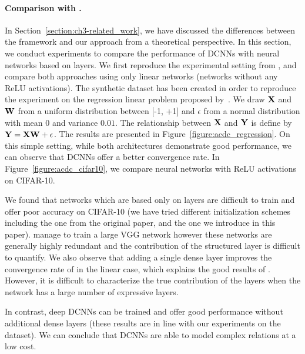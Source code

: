 \paragraph{Comparison with \ACDC \citep{moczulski2015acdc}.}


In Section~\ref{section:ch3-related_work}, we have discussed the differences between the \ACDC framework and our approach from a theoretical perspective.
In this section, we conduct experiments to compare the performance of DCNNs with neural networks based on \ACDC layers. 
We first reproduce the experimental setting from \citet{moczulski2015acdc}, and compare both approaches using only linear networks (\ie networks without any ReLU activations).
The synthetic dataset has been created in order to reproduce the experiment on the regression linear problem proposed by~\citet{moczulski2015acdc}.
We draw $\mathbf{X}$ and $\mathbf{W}$ from a uniform distribution between [-1, +1] and $\epsilon$ from a normal distribution with mean 0 and variance $0.01$.
The relationship between $\mathbf{X}$ and $\mathbf{Y}$ is define by $\mathbf{Y} = \mathbf{X}\mathbf{W} + \epsilon$. 
The results are presented in Figure~\ref{figure:acdc_regression}.
On this simple setting, while both architectures demonstrate good performance, we can observe that DCNNs offer a better convergence rate.
In Figure~\ref{figure:acdc_cifar10}, we compare neural networks with ReLU activations on CIFAR-10. 

We found that networks which are based only on \ACDC layers are difficult to train and offer poor accuracy on CIFAR-10 (we have tried different initialization schemes including the one from the original paper, and the one we introduce in this paper).
\citet{moczulski2015acdc} manage to train a large VGG network  however these networks are generally highly redundant and the contribution of the structured layer is difficult to quantify. 
We also observe that adding a single dense layer improves the convergence rate of \ACDC in the linear case, which explains the good results of \citet{moczulski2015acdc}.
However, it is difficult to characterize the true contribution of the \ACDC layers when the network has a large number of expressive layers.

In contrast, deep DCNNs can be trained and offer good performance without additional dense layers (these results are in line with our experiments on the \yt dataset).
We can conclude that DCNNs are able to model complex relations at a low cost. 

